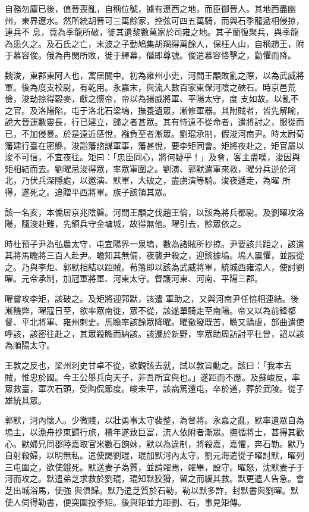 \begin{pinyinscope}
 自務勿塵已後，值晉喪亂，自稱位號，據有遼西之地，而臣御晉人。其地西盡幽州，東界遼水。然所統胡晉可三萬餘家，控弦可四五萬騎，而與石季龍遞相侵掠，連兵不
 息，竟為季龍所破，徙其遺黎數萬家於司雍之地。其子蘭復聚兵，與季龍為患久之。及石氏之亡，末波之子勤鳩集胡羯得萬餘人，保枉人山，自稱趙王，附于慕容俊。俄為冉閔所敗，徙于繹幕，僭即尊號。俊遣慕容恪擊之，勤懼而降。



 魏浚，東郡東阿人也，寓居關中。初為雍州小吏，河間王顒敗亂之際，以為武威將軍。後為度支校尉，有乾用。永嘉末，與流人數百家東保河陰之硤石。時京邑荒儉，浚劫掠得穀麥，獻之懷帝，帝以為揚威將軍、平陽太守，度
 支如故。以亂不之官。及洛陽陷，屯于洛北石梁塢，撫養遺眾，漸修軍器。其附賊者，皆先解喻，說大晉運數靈長，行已建立，歸之者甚眾。其有恃遠不從命者，遣將討之，服從而已，不加侵暴。於是遠近感悅，襁負至者漸眾。劉琨承制，假浚河南尹。時太尉荀籓建行臺在密縣，浚詣籓諮謀軍事，籓甚悅，要李矩同會。矩將夜赴之，矩官屬以浚不可信，不宜夜往。矩曰：「忠臣同心，將何疑乎！」及會，客主盡嘆，浚因與矩相結而去。劉曜忌浚得眾，率眾軍圍之。劉演、郭默遣軍來救，曜分兵逆於河北，乃伏兵深隱處，以邀演、默軍，大破之，盡虜演等騎。浚夜遁走，為曜
 所得，遂死之。追贈平西將軍。族子該領其眾。



 該一名亥，本僑居京兆陰磐。河間王顒之伐趙王倫，以該為將兵都尉。及劉曜攻洛陽，隨浚赴難，先領兵守金墉城，故得無他。曜引去，餘眾依之。



 時杜預子尹為弘農太守，屯宜陽界一泉塢，數為諸賊所抄掠。尹要該共距之，該遣其將馬瞻將三百人赴尹。瞻知其無備，夜襲尹殺之，迎該據塢。塢人震懼，並服從之。乃與李炬、郭默相結以距賊。荀籓即以該為武威將軍，統城西雍涼人，使討劉曜。元帝承制，加冠軍將軍、河東太守。督護河東、河南、平陽三郡。



 曜嘗攻李矩，該破之。及矩將迎郭默，該遣
 軍助之，又與河南尹任愔相連結。後漸饑弊，曜寇日至，欲率眾南徙，眾不從，該遂單騎走至南陽。帝又以為前鋒都督、平北將軍、雍州刺史。馬瞻率該餘眾降曜。曜徵發既苦，瞻又驕虐，部曲遣使呼該，該密往赴之，其眾殺瞻而納該。該遷於新野，率眾助周訪討平杜曾，詔以該為順陽太守。



 王敦之反也，梁州刺史甘卓不從，欲觀該去就，試以敦旨動之。該曰：「我本去賊，惟忠於國。今王公舉兵向天子，非吾所宜與也。」遂距而不應。及蘇峻反，率眾救臺，軍次石頭，受陶侃節度。峻未平，該病篤還屯，卒於道，葬於武陵。從子雄統其眾。



 郭默，河內懷人。少微賤，以壯勇事太守裴整，為督將。永嘉之亂，默率遺眾自為塢主，以漁舟抄東歸行旅，積年遂致巨富，流人依附者漸眾。撫循將士，甚得其歡心。默婦兄同郡陸嘉取官米數石餉妹，默以為違制，將殺嘉，嘉懼，奔石勒。默乃自射殺婦，以明無私。遣使謁劉琨，琨加默河內太守。劉元海遣從子曜討默，曜列三屯圍之，欲使餓死。默送妻子為質，並請糴焉，糴畢，設守。曜怒，沈默妻子于河而攻之。默遣弟芝求救於劉琨，琨知默狡猾，留之而緩其救。默更遣人告急。會芝出城浴馬，使強
 與俱歸。默乃遣芝質於石勒，勒以默多詐，封默書與劉曜。默使人伺得勒書，便突圍投李矩。後與矩並力距劉、石，事見矩傳。




\end{pinyinscope}
